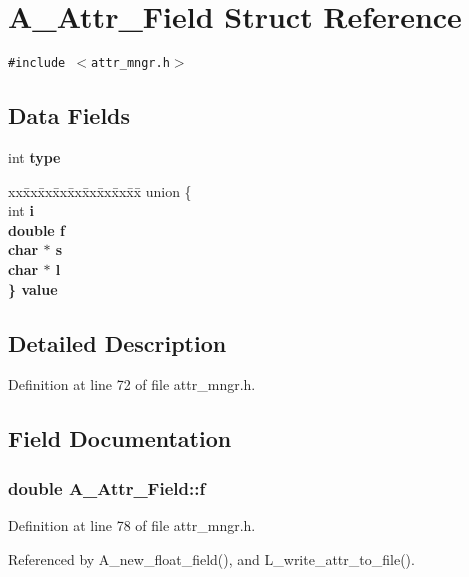 \section{A\_\-Attr\_\-Field Struct Reference}
\label{structA__Attr__Field}
{\tt \#include $<$attr\_\-mngr.h$>$}

\subsection*{Data Fields}
\begin{CompactItemize}
\item 
int \bf{type}
\item 
\begin{tabbing}
xx\=xx\=xx\=xx\=xx\=xx\=xx\=xx\=xx\=\kill
union \{\\
\>int \bf{i}\\
\>double \bf{f}\\
\>char $\ast$ \bf{s}\\
\>char $\ast$ \bf{l}\\
\} \bf{value}\\

\end{tabbing}\end{CompactItemize}


\subsection{Detailed Description}




Definition at line 72 of file attr\_\-mngr.h.

\subsection{Field Documentation}
\subsubsection{\setlength{\rightskip}{0pt plus 5cm}double \bf{A\_\-Attr\_\-Field::f}}\label{structA__Attr__Field_7adb2b4f710c4eb0ac4694f05cf272b1}




Definition at line 78 of file attr\_\-mngr.h.

Referenced by A\_\-new\_\-float\_\-field(), and L\_\-write\_\-attr\_\-to\_\-file().
